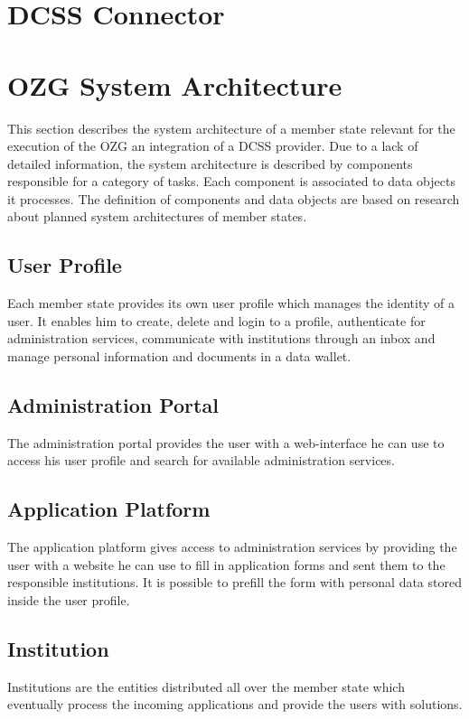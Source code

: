 \documentclass[
     12pt,         %
     a4paper,      %
     BCOR=10mm,version=first,     %
     DIV=14,version=first,        %
     ]{scrreprt}
\begin{document}
\section{DCSS Connector}

\section{OZG System Architecture}
This section describes the system architecture of a member state relevant for the execution of the OZG an integration of a DCSS provider. Due to a lack of detailed information, the system architecture is described by components responsible for a category of tasks. Each component is associated to data objects it processes. The definition of components and data objects are based on research about planned system architectures of member states.

\subsection{User Profile}
Each member state provides its own user profile which manages the identity of a user. It enables him to create, delete and login to a profile, authenticate for administration services, communicate with institutions through an inbox and manage personal information and documents in a data wallet.

\subsection{Administration Portal}
The administration portal provides the user with a web-interface he can use to access his user profile and search for available administration services.

\subsection{Application Platform}
The application platform gives access to administration services by providing the user with a website he can use to fill in application forms and sent them to the responsible institutions. It is possible to prefill the form with personal data stored inside the user profile.

\subsection{Institution}
Institutions are the entities distributed all over the member state which eventually process the incoming applications and provide the users with solutions.
\end{document}
